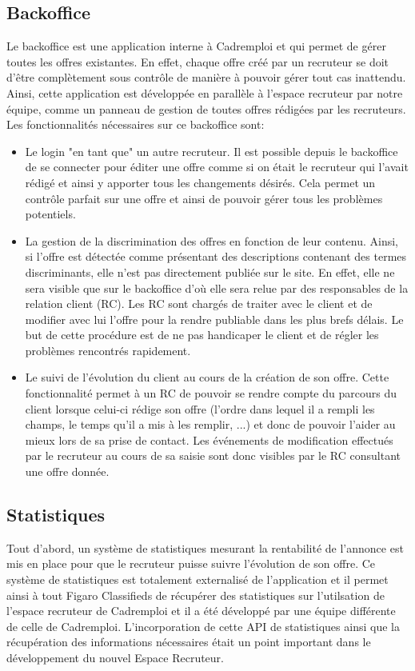 \subsection{Backoffice}
\label{sub:Backoffice}
Le backoffice est une application interne à Cadremploi et qui permet de gérer toutes les offres existantes.
En effet, chaque offre créé par un recruteur se doit d'être complètement sous contrôle de manière à pouvoir gérer tout cas inattendu.
Ainsi, cette application est développée en parallèle à l'espace recruteur par notre équipe, comme un panneau de gestion de toutes offres rédigées par les recruteurs.
Les fonctionnalités nécessaires sur ce backoffice sont:
\begin{itemize}
  \item Le login "en tant que" un autre recruteur.
  Il est possible depuis le backoffice de se connecter pour éditer une offre comme si on était le recruteur qui l'avait rédigé et ainsi y apporter tous les changements désirés.
  Cela permet un contrôle parfait sur une offre et ainsi de pouvoir gérer tous les problèmes potentiels.
  \item La gestion de la discrimination des offres en fonction de leur contenu.
  Ainsi, si l'offre est détectée comme présentant des descriptions contenant des termes discriminants, elle n'est pas directement publiée sur le site.
  En effet, elle ne sera visible que sur le backoffice d'où elle sera relue par des responsables de la relation client (RC).
  Les RC sont chargés de traiter avec le client et de modifier avec lui l'offre pour la rendre publiable dans les plus brefs délais.
  Le but de cette procédure est de ne pas handicaper le client et de régler les problèmes rencontrés rapidement.
  \item Le suivi de l'évolution du client au cours de la création de son offre.
  Cette fonctionnalité permet à un RC de pouvoir se rendre compte du parcours du client lorsque celui-ci rédige son offre (l'ordre dans lequel il a rempli les champs, le temps qu'il a mis à les remplir, ...) et donc de pouvoir l'aider au mieux lors de sa prise de contact.
  Les événements de modification effectués par le recruteur au cours de sa saisie sont donc visibles par le RC consultant une offre donnée.
\end{itemize}

\subsection{Statistiques}
\label{sub:Statistiques}
Tout d'abord, un système de statistiques mesurant la rentabilité de l'annonce est mis en place pour que le recruteur puisse suivre l'évolution de son offre.
Ce système de statistiques est totalement externalisé de l'application et il permet ainsi à tout Figaro Classifieds de récupérer des statistiques sur l'utilsation de l'espace recruteur de Cadremploi et il a été développé par une équipe différente de celle de Cadremploi.
L'incorporation de cette API de statistiques ainsi que la récupération des informations nécessaires était un point important dans le développement du nouvel Espace Recruteur.

